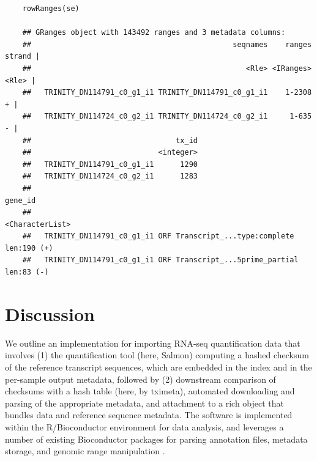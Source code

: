 \documentclass[12pt]{article} \usepackage[utf8]{inputenc}
\begin{document}
\begin{verbatim}
    rowRanges(se)

    ## GRanges object with 143492 ranges and 3 metadata columns:
    ##                                              seqnames    ranges strand |
    ##                                                 <Rle> <IRanges>  <Rle> |
    ##   TRINITY_DN114791_c0_g1_i1 TRINITY_DN114791_c0_g1_i1    1-2308      + |
    ##   TRINITY_DN114724_c0_g2_i1 TRINITY_DN114724_c0_g2_i1     1-635      - |
    ##                                 tx_id
    ##                             <integer>
    ##   TRINITY_DN114791_c0_g1_i1      1290
    ##   TRINITY_DN114724_c0_g2_i1      1283
    ##                                                                 gene_id
    ##                                                         <CharacterList>
    ##   TRINITY_DN114791_c0_g1_i1 ORF Transcript_...type:complete len:190 (+)
    ##   TRINITY_DN114791_c0_g1_i1 ORF Transcript_...5prime_partial len:83 (-)
\end{verbatim}

\section*{Discussion}

We outline an implementation for importing RNA-seq quantification
data that involves (1) the quantification tool (here, Salmon)
computing a hashed checksum of the reference transcript sequences,
which are embedded in the index and in the per-sample output metadata,
followed by (2) downstream comparison of checksums with a hash table
(here, by tximeta), automated downloading and parsing of the
appropriate metadata, and attachment to a rich object that bundles
data and reference sequence metadata. The software is implemented
within the R/Bioconductor environment for data analysis, and leverages
a number of existing Bioconductor packages for parsing annotation
files, metadata storage, and genomic range manipulation
\citep{bioc,ensembldb,biocfilecache,granges}.
\end{document}
